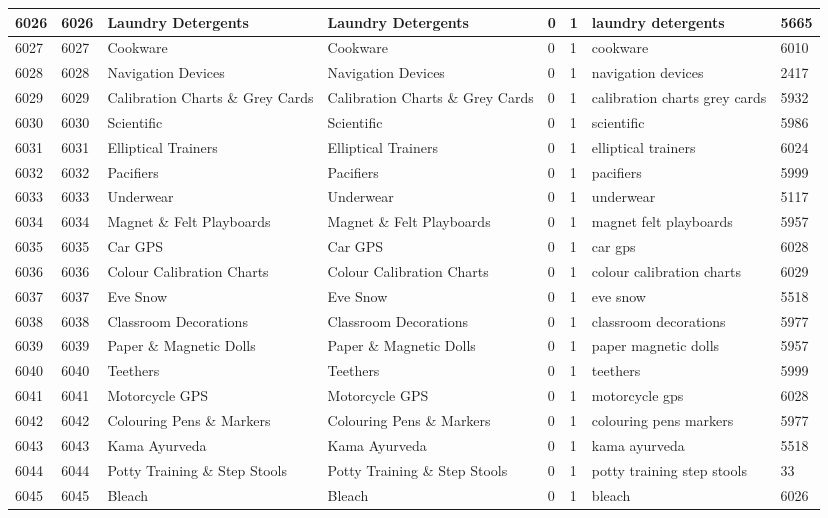 \begin{longtable}{|l|l|l|l|l|l|l|l|}
6026 & 6026 & Laundry Detergents & Laundry Detergents & 0 & 1 & laundry detergents & 5665 \\ \hline 
6027 & 6027 & Cookware & Cookware & 0 & 1 & cookware & 6010 \\ \hline 
6028 & 6028 & Navigation Devices & Navigation Devices & 0 & 1 & navigation devices & 2417 \\ \hline 
6029 & 6029 & Calibration Charts \& Grey Cards & Calibration Charts \& Grey Cards & 0 & 1 & calibration charts grey cards & 5932 \\ \hline 
6030 & 6030 & Scientific & Scientific & 0 & 1 & scientific & 5986 \\ \hline 
6031 & 6031 & Elliptical Trainers & Elliptical Trainers & 0 & 1 & elliptical trainers & 6024 \\ \hline 
6032 & 6032 & Pacifiers & Pacifiers & 0 & 1 & pacifiers & 5999 \\ \hline 
6033 & 6033 & Underwear & Underwear & 0 & 1 & underwear & 5117 \\ \hline 
6034 & 6034 & Magnet \& Felt Playboards & Magnet \& Felt Playboards & 0 & 1 & magnet felt playboards & 5957 \\ \hline 
6035 & 6035 & Car GPS & Car GPS & 0 & 1 & car gps & 6028 \\ \hline 
6036 & 6036 & Colour Calibration Charts & Colour Calibration Charts & 0 & 1 & colour calibration charts & 6029 \\ \hline 
6037 & 6037 & Eve Snow & Eve Snow & 0 & 1 & eve snow & 5518 \\ \hline 
6038 & 6038 & Classroom Decorations & Classroom Decorations & 0 & 1 & classroom decorations & 5977 \\ \hline 
6039 & 6039 & Paper \& Magnetic Dolls & Paper \& Magnetic Dolls & 0 & 1 & paper magnetic dolls & 5957 \\ \hline 
6040 & 6040 & Teethers & Teethers & 0 & 1 & teethers & 5999 \\ \hline 
6041 & 6041 & Motorcycle GPS & Motorcycle GPS & 0 & 1 & motorcycle gps & 6028 \\ \hline 
6042 & 6042 & Colouring Pens \& Markers & Colouring Pens \& Markers & 0 & 1 & colouring pens markers & 5977 \\ \hline 
6043 & 6043 & Kama Ayurveda & Kama Ayurveda & 0 & 1 & kama ayurveda & 5518 \\ \hline 
6044 & 6044 & Potty Training \& Step Stools & Potty Training \& Step Stools & 0 & 1 & potty training step stools & 33 \\ \hline 
6045 & 6045 & Bleach & Bleach & 0 & 1 & bleach & 6026 \\ \hline 

\end{longtable}

